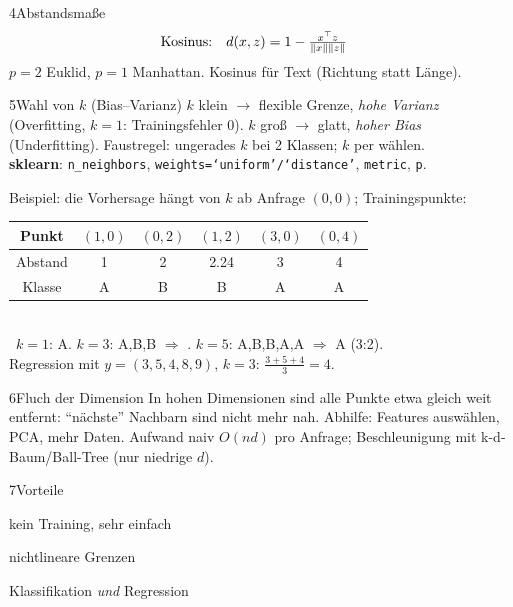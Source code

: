 \begin{hngrid}
\begin{hnp}[raster multicolumn=3,acc=hnnavy]{4}{Abstandsmaße}
\begin{align*}
\text{Kosinus:}&\quad d(x,z)=1-\tfrac{x^{\top} z}{\|x\|\|z\|}
\end{align*}
$p=2$ Euklid, $p=1$ Manhattan. Kosinus für Text (Richtung statt Länge).
\end{hnp}
%
\begin{hnp}[raster multicolumn=3,acc=hngreen]{5}{Wahl von $k$ (Bias--Varianz)}
$k$ klein $\to$ flexible Grenze, \emph{hohe Varianz} (Overfitting, $k{=}1$: Trainingsfehler $0$). $k$ groß $\to$ glatt, \emph{hoher Bias} (Underfitting). Faustregel: ungerades $k$ bei 2 Klassen; $k$ per  wählen.\\
\textbf{sklearn}: \texttt{n\_neighbors}, \texttt{weights=`uniform'/`distance'}, \texttt{metric}, \texttt{p}.
\end{hnp}
%
\begin{hnex}[raster multicolumn=3]{Beispiel: die Vorhersage hängt von $k$ ab}
Anfrage $(0,0)$; Trainingspunkte:\\
\renewcommand{\arraystretch}{1.15}
\begin{tabular}{@{}c|ccccc@{}}
Punkt&$(1,0)$&$(0,2)$&$(1,2)$&$(3,0)$&$(0,4)$\\\hline
Abstand&1&2&2.24&3&4\\
Klasse&A&B&B&A&A\\
\end{tabular}\\
\hnsol\ $k=1$: A. \;$k=3$: A,B,B $\Rightarrow$ . \;$k=5$: A,B,B,A,A $\Rightarrow$ A (3:2).\\
Regression mit $y=(3,5,4,8,9)$, $k=3$: $\frac{3+5+4}{3}=4$.
\end{hnex}
%
\begin{hnp}[raster multicolumn=3,acc=hnrose]{6}{Fluch der Dimension}
In hohen Dimensionen sind alle Punkte etwa gleich weit entfernt: ``nächste'' Nachbarn sind nicht mehr nah. Abhilfe: Features auswählen, PCA, mehr Daten. Aufwand naiv $O(nd)$ pro Anfrage; Beschleunigung mit k-d-Baum/Ball-Tree (nur niedrige $d$).
\end{hnp}
%
\begin{hnp}[raster multicolumn=2,acc=hngreen]{7}{Vorteile}
\begin{hnpro}
\item kein Training, sehr einfach
\item nichtlineare Grenzen
\item Klassifikation \emph{und} Regression
\end{hnpro}
\end{hnp}

\end{hngrid}
